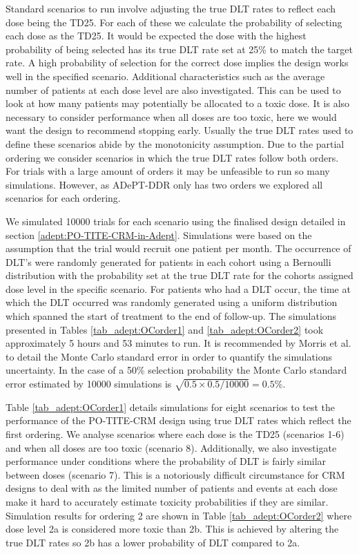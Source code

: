 Standard scenarios to run involve adjusting the true DLT rates to reflect each dose being the TD25. For each of these we calculate the probability of selecting each dose as the TD25. It would be expected the dose with the highest probability of being selected has its true DLT rate set at 25\% to match the target rate. A high probability of selection for the correct dose implies the design works well in the specified scenario. Additional characteristics such as the average number of patients at each dose level are also investigated. This can be used to look at how many patients may potentially be allocated to a toxic dose. It is also necessary to consider performance when all doses are too toxic, here we would want the design to recommend stopping early. Usually the true DLT rates used to define these scenarios abide by the monotonicity assumption. Due to the partial ordering we consider scenarios in which the true DLT rates follow both orders. For trials with a large amount of orders it may be unfeasible to run so many simulations. However, as ADePT-DDR only has two orders we explored all scenarios for each ordering.

We simulated 10000 trials for each scenario using the finalised design detailed in section \ref{adept:PO-TITE-CRM-in-Adept}. Simulations were based on the assumption that the trial would recruit one patient per month. The occurrence of DLT's were randomly generated for patients in each cohort using a Bernoulli distribution with the probability set at the true DLT rate for the cohorts assigned dose level in the specific scenario. For patients who had a DLT occur, the time at which the DLT occurred was randomly generated using a uniform distribution which spanned the start of treatment to the end of follow-up. The simulations presented in Tables \ref{tab_adept:OCorder1} and \ref{tab_adept:OCorder2} took approximately 5 hours and 53 minutes to run. It is recommended by Morris et al. \cite{morrisUsingSimulationStudies2019} to detail the Monte Carlo standard error in order to quantify the simulations uncertainty. In the case of a 50\% selection probability the Monte Carlo standard error estimated by 10000 simulations is $\sqrt{0.5 \times 0.5/10000} = 0.5\%$. 

Table \ref{tab_adept:OCorder1} details simulations for eight scenarios to test the performance of the PO-TITE-CRM design using true DLT rates which reflect the first ordering. We analyse scenarios where each dose is the TD25 (scenarios 1-6) and when all doses are too toxic (scenario 8). Additionally, we also investigate performance under conditions where the probability of DLT is fairly similar between doses (scenario 7). This is a notoriously difficult circumstance for CRM designs to deal with as the limited number of patients and events at each dose make it hard to accurately estimate toxicity probabilities if they are similar. Simulation results for ordering 2 are shown in Table \ref{tab_adept:OCorder2} where dose level 2a is considered more toxic than 2b. This is achieved by altering the true DLT rates so 2b has a lower probability of DLT compared to 2a. 

